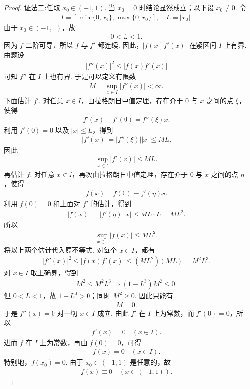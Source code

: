 \documentclass[../../main.tex]{subfiles}%
\begin{document}
\begin{proof}
{\color{blue}证法二:}任取 $x_0 \in (-1,1)$. 当 $x_0 = 0$ 时结论显然成立；以下设 $x_0 \neq 0$. 令
\begin{align*}
I = [\min\{0, x_0\}, \max\{0, x_0\}], \quad L = |x_0|.
\end{align*}
由于 $x_0 \in (-1,1)$，故
\begin{align*}
0 < L < 1.
\end{align*}
因为 $f$ 二阶可导，所以 $f$ 与 $f'$ 都连续. 因此，$|f(x)f'(x)|$ 在紧区间 $I$ 上有界. 由题设
\begin{align*}
|f''(x)|^2 \leqslant |f(x)f'(x)|
\end{align*}
可知 $f''$ 在 $I$ 上也有界. 于是可以定义有限数
\begin{align}
M = \sup_{x \in I} |f''(x)| < \infty. \label{eq:Mdef}
\end{align}
下面估计 $f'$. 对任意 $x \in I$，由拉格朗日中值定理，存在介于 $0$ 与 $x$ 之间的点 $\xi$，使得
\begin{align*}
f'(x) - f'(0) = f''(\xi)x.
\end{align*}
利用 $f'(0) = 0$ 以及 $|x| \leqslant L$，得到
\begin{align*}
|f'(x)| = |f''(\xi)| |x| \leqslant ML.
\end{align*}
因此
\begin{align*}
\sup_{x \in I} |f'(x)| \leqslant ML.
\end{align*}
再估计 $f$. 对任意 $x \in I$，再次由拉格朗日中值定理，存在介于 $0$ 与 $x$ 之间的点 $\eta$，使得
\begin{align*}
f(x) - f(0) = f'(\eta)x.
\end{align*}
利用 $f(0) = 0$ 和上面对 $f'$ 的估计，得到
\begin{align*}
|f(x)| = |f'(\eta)| |x| \leqslant ML \cdot L = ML^2.
\end{align*}
所以
\begin{align*}
\sup_{x \in I} |f(x)| \leqslant ML^2.
\end{align*}
将以上两个估计代入原不等式. 对每个 $x \in I$，都有
\begin{align*}
|f''(x)|^2 \leqslant |f(x)f'(x)| \leqslant (ML^2)(ML) = M^2L^3.
\end{align*}
对 $x \in I$ 取上确界，得到
\begin{align*}
M^2 \leqslant M^2L^3\Longrightarrow (1 - L^3)M^2 \leqslant 0.
\end{align*}
但 $0 < L < 1$，故 $1 - L^3 > 0$；同时 $M^2 \geqslant 0$. 因此只能有
\begin{align*}
M = 0.
\end{align*}
于是 $f''(x) = 0$ 对一切 $x \in I$ 成立. 由此 $f'$ 在 $I$ 上为常数，而 $f'(0) = 0$，所以
\begin{align*}
f'(x) = 0 \quad (x \in I).
\end{align*}
进而 $f$ 在 $I$ 上为常数，再由 $f(0) = 0$，可得
\begin{align*}
f(x) = 0 \quad (x \in I).
\end{align*}
特别地，$f(x_0) = 0$.
由于 $x_0 \in (-1,1)$ 是任意的，故
\begin{align*}
f(x) \equiv 0 \quad (x \in (-1,1)).
\end{align*}
\end{proof}
\end{document}
